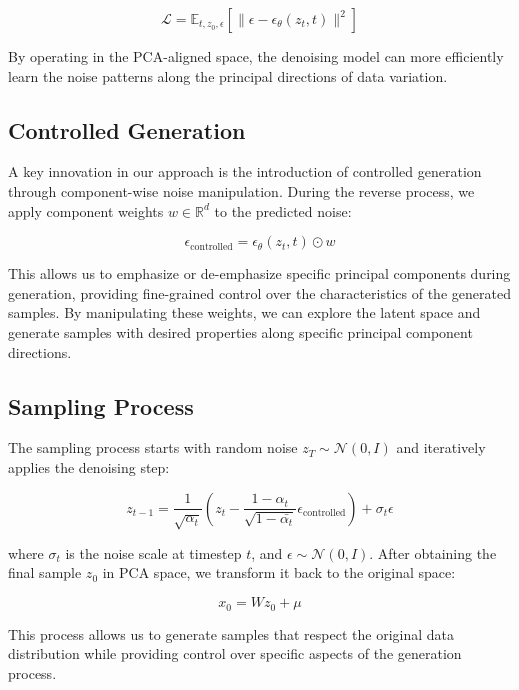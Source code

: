 \documentclass{article} %
\begin{document}
\begin{equation}
    \mathcal{L} = \mathbb{E}_{t,z_0,\epsilon}\left[\|\epsilon - \epsilon_\theta(z_t, t)\|^2\right]
\end{equation}

By operating in the PCA-aligned space, the denoising model can more efficiently learn the noise patterns along the principal directions of data variation.

\subsection{Controlled Generation}
A key innovation in our approach is the introduction of controlled generation through component-wise noise manipulation. During the reverse process, we apply component weights $w \in \mathbb{R}^d$ to the predicted noise:

\begin{equation}
    \epsilon_\text{controlled} = \epsilon_\theta(z_t, t) \odot w
\end{equation}

This allows us to emphasize or de-emphasize specific principal components during generation, providing fine-grained control over the characteristics of the generated samples. By manipulating these weights, we can explore the latent space and generate samples with desired properties along specific principal component directions.

\subsection{Sampling Process}
The sampling process starts with random noise $z_T \sim \mathcal{N}(0, I)$ and iteratively applies the denoising step:

\begin{equation}
    z_{t-1} = \frac{1}{\sqrt{\alpha_t}}(z_t - \frac{1-\alpha_t}{\sqrt{1-\bar{\alpha_t}}}\epsilon_\text{controlled}) + \sigma_t \epsilon
\end{equation}

where $\sigma_t$ is the noise scale at timestep $t$, and $\epsilon \sim \mathcal{N}(0, I)$. After obtaining the final sample $z_0$ in PCA space, we transform it back to the original space:

\begin{equation}
    x_0 = Wz_0 + \mu
\end{equation}

This process allows us to generate samples that respect the original data distribution while providing control over specific aspects of the generation process.
\end{document}
